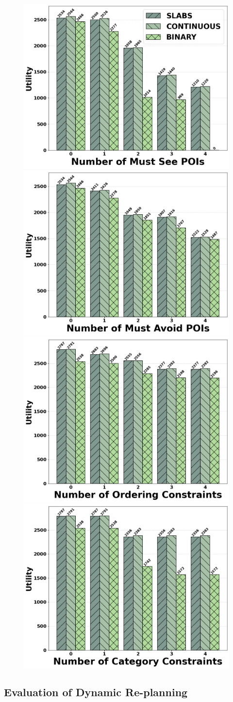 \begin{figure}[t]
\centering
\includegraphics[width=0.48\columnwidth]{plots/mustsee.png}
\includegraphics[width=0.48\columnwidth]{plots/mustavoid.png}
\includegraphics[width=0.48\columnwidth]{plots/ordering.png}
\includegraphics[width=0.48\columnwidth]{plots/category.png}
\label{fig:personalizedconstraints}
\end{figure}

\subsection{Evaluation of Dynamic Re-planning}
\label{sec:exp dynamic replanning} 

